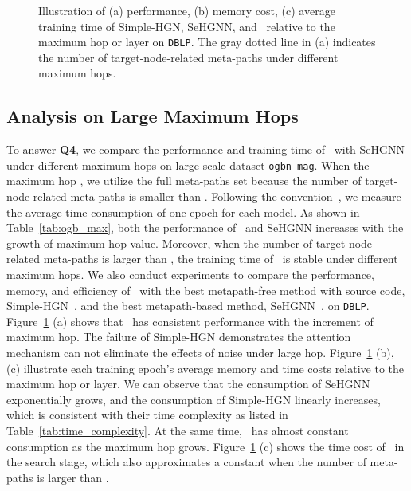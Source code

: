 \begin{figure}[!t]
\footnotesize
\centering
{}
\vspace{1.2pt}
\hspace{0.3em}
\hspace{0.3em}
\vspace{-3pt}
\caption{ Illustration of 
(a) performance, (b) memory cost, (c) average training time of Simple-HGN, SeHGNN, and \model~relative to the maximum hop or layer on \texttt{DBLP}. The gray dotted line in (a) indicates the number of target-node-related meta-paths under different maximum hops.  
}
\label{fig:largehop}
\vspace{-3pt}
\end{figure} \subsection{Analysis on Large Maximum Hops}





To answer \textbf{Q4}, we compare the performance and training time of \model~with SeHGNN under different maximum hops on large-scale dataset \texttt{ogbn-mag}. When the maximum hop , we utilize the full meta-paths set because the number of target-node-related meta-paths is smaller than . 
Following the convention~\citep{lv2021we,yang2022simple}, we measure the average time consumption of one epoch for each model. As shown in Table~\ref{tab:ogb_max}, both the performance of \model~and SeHGNN increases with the growth of maximum hop value.   
Moreover, when the number of target-node-related meta-paths is larger than , the training time of \model~is stable under different maximum hops. 
We also conduct experiments to compare the performance, memory, and efficiency of \model~with the best metapath-free method with source code, Simple-HGN~\citep{lv2021we}, and the best metapath-based method, SeHGNN~\citep{yang2022simple}, on \texttt{DBLP}. Figure~\ref{fig:largehop} (a) shows that \model~has consistent performance with  the increment of maximum hop. 
The failure of Simple-HGN demonstrates the attention mechanism can not eliminate the effects of noise under large hop. 
Figure~\ref{fig:largehop} (b), (c) illustrate each training epoch's average memory and time costs relative to the maximum hop or layer. 
We can observe that the consumption of SeHGNN exponentially grows, and the consumption of Simple-HGN linearly increases, which is consistent with their time complexity as listed in Table~\ref{tab:time_complexity}. At the same time, \model~has almost constant consumption as the maximum hop grows. Figure~\ref{fig:largehop} (c) shows the time cost of \model~in the search stage, which also approximates a constant when the number of meta-paths is larger than . 


